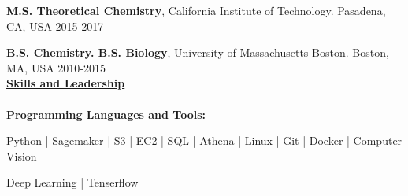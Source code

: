 \documentclass[letterpaper]{article}
\begin{document}
\textbf{M.S. Theoretical Chemistry}, California Institute of Technology.
Pasadena, CA, USA  \hfill 2015-2017 \\
\vspace{-0.1in}

\textbf{B.S. Chemistry. B.S. Biology}, University of
Massachusetts Boston.
Boston, MA, USA  \hfill 2010-2015 \\

\vspace{0.15in}
{\large \textbf{\underline{Skills and Leadership}}}\\
\vspace{-0.2in}\\

\textbf{Programming Languages and Tools:}

Python | Sagemaker | S3 | EC2 | SQL | Athena | Linux | Git | Docker |
Computer Vision

 Deep Learning | Tenserflow
\end{document}
